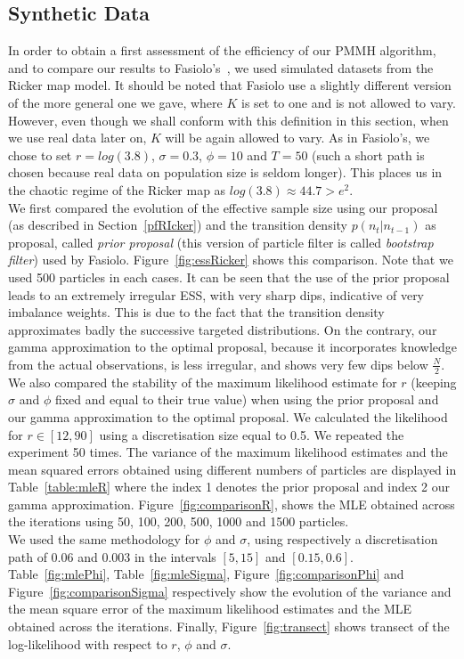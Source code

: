 \documentclass[12pt]{article}
\begin{document}
	
	\subsection{Synthetic Data}
	In order to obtain a first assessment of the efficiency of our PMMH algorithm, and to compare our results to Fasiolo's~\cite{fasiolo2014statistical}, we used simulated datasets from the Ricker map model. It should be noted that Fasiolo use a slightly different version of the more general one we gave, where $K$ is set to one and is not allowed to vary. However, even though we shall conform with this definition in this section, when we use real data later on, $K$ will be again allowed to vary. As in Fasiolo's, we chose to set $r=log(3.8)$, $\sigma=0.3$, $\phi=10$ and $T=50$ (such a short path is chosen because real data on population size is seldom longer). This places us in the  chaotic regime of the Ricker map as $log(3.8) \approx 44.7 > e^2$. \\
	
	We first compared the evolution of the effective sample size using our proposal (as described in Section~\ref{pfRIcker}) and the transition density $p(n_t|n_{t-1})$ as proposal, called \emph{prior proposal} (this version of particle filter is called \emph{bootstrap filter}) used by Fasiolo. Figure~\ref{fig:essRicker} shows this comparison. Note that we used 500 particles in each cases. It can be seen that the use of the prior proposal leads to an extremely irregular ESS, with very sharp dips, indicative of very imbalance weights. This is due to the fact that the transition density approximates badly the successive targeted distributions. On the contrary, our gamma approximation to the optimal proposal, because it incorporates knowledge from the actual observations, is less irregular, and shows very few dips below $\frac{N}{2}$. \\
	
	We also compared the stability of the maximum likelihood estimate for $r$ (keeping $\sigma$ and $\phi$ fixed and equal to their true value) when using the prior proposal and our gamma approximation to the optimal proposal. We calculated the likelihood for $r \in [12, 90]$ using a discretisation size equal to 0.5. We repeated the experiment 50 times. The variance of the maximum likelihood estimates and the mean squared errors obtained using different numbers of particles are displayed in Table~\ref{table:mleR} where the index 1 denotes the prior proposal and index 2 our gamma approximation. Figure~\ref{fig:comparisonR}, shows the MLE obtained across the iterations using 50, 100, 200, 500, 1000 and 1500 particles. \\
	We used the same methodology for $\phi$ and $\sigma$, using respectively a discretisation path of 0.06 and 0.003 in the intervals $[5, 15]$ and $[0.15, 0.6]$. Table~\ref{fig:mlePhi}, Table~\ref{fig:mleSigma}, Figure~\ref{fig:comparisonPhi} and Figure~\ref{fig:comparisonSigma} respectively show the evolution of the variance and the mean square error of the maximum likelihood estimates and the MLE obtained across the iterations. Finally, Figure~\ref{fig:transect} shows transect of the log-likelihood with respect to $r$, $\phi$ and $\sigma$. 
	
\end{document}
